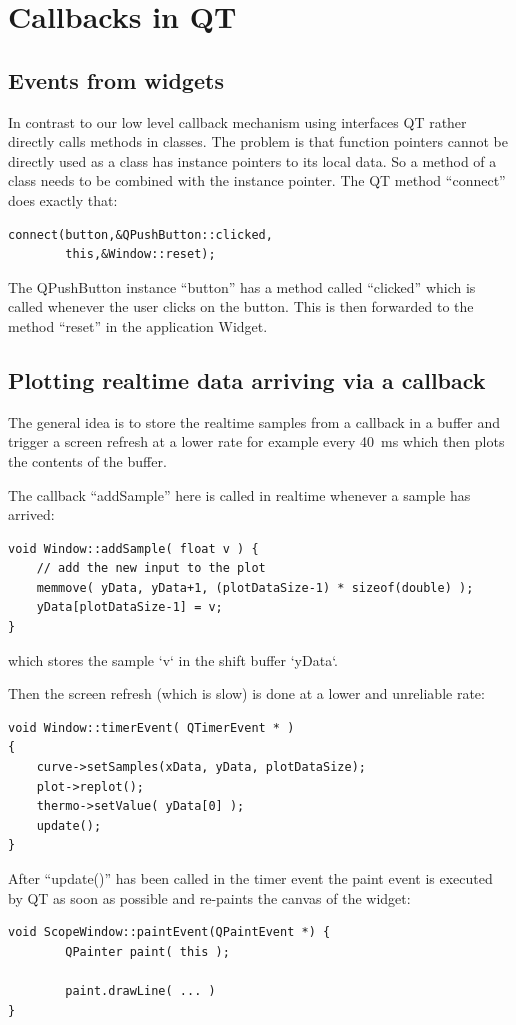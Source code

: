 \documentclass[12pt]{report}
\begin{document}
\section{Callbacks in QT}
\subsection{Events from widgets}
In contrast to our low level callback mechanism using interfaces QT rather
directly calls methods in classes. The problem is that function pointers
cannot be directly used as a class has instance pointers to its local
data. So a method of a class needs to be combined with the instance
pointer. The QT method ``connect'' does exactly that:
\begin{verbatim}
connect(button,&QPushButton::clicked,
        this,&Window::reset);
\end{verbatim}
The QPushButton instance ``button'' has a method called ``clicked'' which is
called whenever the user clicks on the button. This is then forwarded to the
method ``reset'' in the application Widget.


\subsection{Plotting realtime data arriving via a callback}
The general idea is to store the realtime samples from a callback in a
buffer and trigger a screen refresh at a lower rate for example every
40~ms which then plots the contents of the buffer.

The callback ``addSample'' here is called in realtime whenever
a sample has arrived:
\begin{verbatim}
void Window::addSample( float v ) {
    // add the new input to the plot
    memmove( yData, yData+1, (plotDataSize-1) * sizeof(double) );
    yData[plotDataSize-1] = v;
}
\end{verbatim}
which stores the sample `v` in the shift buffer `yData`.

Then the screen refresh (which is slow) is done at
a lower and unreliable rate:
\begin{verbatim}
void Window::timerEvent( QTimerEvent * )
{
    curve->setSamples(xData, yData, plotDataSize);
    plot->replot();
    thermo->setValue( yData[0] );
    update();
}
\end{verbatim}

After ``update()'' has been called in the timer event the
paint event is executed by QT as soon as possible and re-paints
the canvas of the widget:
\begin{verbatim}
void ScopeWindow::paintEvent(QPaintEvent *) {
        QPainter paint( this );

        paint.drawLine( ... )
}
\end{verbatim}
\end{document}
